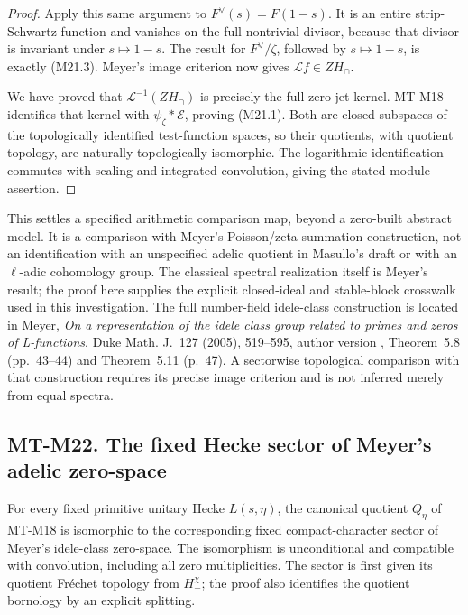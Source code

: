 \documentclass[11pt,a4paper]{article}
\begin{document}
\begin{proof}
Apply this same argument to \(F^\vee(s)=F(1-s)\).
It is an entire strip-Schwartz function and vanishes on
the full nontrivial divisor, because that divisor is
invariant under \(s\mapsto1-s\). The result for
\(F^\vee/\zeta\), followed by \(s\mapsto1-s\),
is exactly (M21.3). Meyer's image criterion now gives
\(\mathcal Lf\in ZH_\cap\).

We have proved that \(\mathcal L^{-1}(ZH_\cap)\)
is precisely the full zero-jet kernel. MT-M18 identifies
that kernel with \(\overline{\psi_\zeta*\mathcal E}\),
proving (M21.1). Both are closed subspaces of the
topologically identified test-function spaces, so their
quotients, with quotient topology, are naturally
topologically isomorphic. The logarithmic identification
commutes with scaling and integrated convolution, giving
the stated module assertion.
\end{proof}

This settles a specified arithmetic comparison map, beyond
a zero-built abstract model. It is a comparison with
Meyer's Poisson/zeta-summation construction, not an
identification with an unspecified adelic quotient in
Masullo's draft or with an \(\ell\)-adic cohomology group.
The classical spectral realization itself is Meyer's
result; the proof here supplies the explicit closed-ideal
and stable-block crosswalk used in this investigation.
The full number-field idele-class construction is located
in Meyer, \emph{On a representation of the idele class
group related to primes and zeros of L-functions},
Duke Math. J.~127 (2005), 519--595, author version
, Theorem~5.8 (pp.~43--44) and
Theorem~5.11 (p.~47). A sectorwise topological comparison
with that construction requires its precise image
criterion and is not inferred merely from equal spectra.


\subsection*{MT-M22. The fixed Hecke sector of Meyer's adelic zero-space}

For every fixed primitive unitary Hecke \(L(s,\eta)\), the
canonical quotient \(Q_\eta\) of MT-M18 is isomorphic to the
corresponding fixed compact-character sector of Meyer's
idele-class zero-space.  The isomorphism is unconditional
and compatible with convolution, including all zero
multiplicities.  The sector is first given its quotient
Fr\'echet topology from \(H_-^\chi\); the proof also
identifies the quotient bornology by an explicit splitting.
\end{document}
